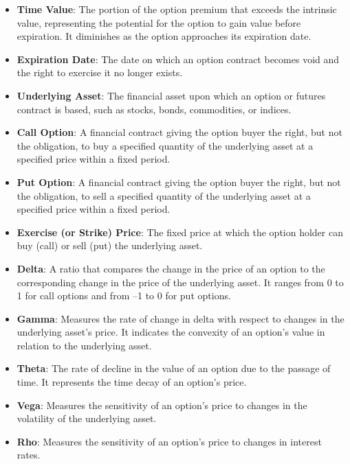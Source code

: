 \documentclass[12pt,a4paper]{report}
\numberwithin{equation}{section}
\begin{document}
\begin{itemize}
\item \textbf{Time Value}: The portion of the option premium that exceeds the
intrinsic value, representing the potential for the option to gain value
before expiration. It diminishes as the option approaches its expiration
date.

\item \textbf{Expiration Date}: The date on which an option contract becomes void
and the right to exercise it no longer exists.

\item \textbf{Underlying Asset}: The financial asset upon which an option or
futures contract is based, such as stocks, bonds, commodities, or
indices.

\item \textbf{Call Option}: A financial contract giving the option buyer the right,
but not the obligation, to buy a specified quantity of the underlying
asset at a specified price within a fixed period.

\item \textbf{Put Option}: A financial contract giving the option buyer the right,
but not the obligation, to sell a specified quantity of the underlying
asset at a specified price within a fixed period.

\item \textbf{Exercise (or Strike) Price}: The fixed price at which the option
holder can buy (call) or sell (put) the underlying asset.

\item \textbf{Delta}: A ratio that compares the change in the price of an option to
the corresponding change in the price of the underlying asset. It ranges
from 0 to 1 for call options and from --1 to 0 for put options.

\item \textbf{Gamma}: Measures the rate of change in delta with respect to changes
in the underlying asset's price. It indicates the convexity of an
option's value in relation to the underlying asset.

\item \textbf{Theta}: The rate of decline in the value of an option due to the
passage of time. It represents the time decay of an option's price.

\item \textbf{Vega}: Measures the sensitivity of an option's price to changes in
the volatility of the underlying asset.

\item \textbf{Rho}: Measures the sensitivity of an option's price to changes in
interest rates.


\end{itemize}
\end{document}
